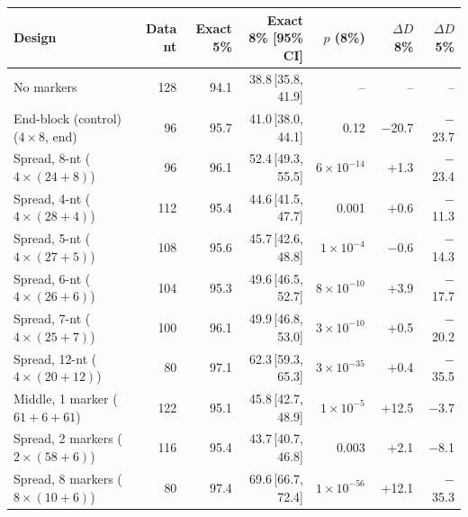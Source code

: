 \begin{tabular}{lrrrrrr}
\hline
Design & Data nt & Exact 5\% & Exact 8\% [95\% CI] & $p$ (8\%) & $\Delta D$ 8\% & $\Delta D$ 5\% \\
\hline
No markers & 128 & 94.1 & 38.8\,[35.8, 41.9] & -- & -- & -- \\
End-block (control) ($4\times8$, end) & 96 & 95.7 & 41.0\,[38.0, 44.1] & 0.12 & $-$20.7 & $-$23.7 \\
Spread, 8-nt ($4\times(24+8)$) & 96 & 96.1 & 52.4\,[49.3, 55.5] & $6\times10^{-14}$ & +1.3 & $-$23.4 \\
Spread, 4-nt ($4\times(28+4)$) & 112 & 95.4 & 44.6\,[41.5, 47.7] & 0.001 & +0.6 & $-$11.3 \\
Spread, 5-nt ($4\times(27+5)$) & 108 & 95.6 & 45.7\,[42.6, 48.8] & $1\times10^{-4}$ & $-$0.6 & $-$14.3 \\
Spread, 6-nt ($4\times(26+6)$) & 104 & 95.3 & 49.6\,[46.5, 52.7] & $8\times10^{-10}$ & +3.9 & $-$17.7 \\
Spread, 7-nt ($4\times(25+7)$) & 100 & 96.1 & 49.9\,[46.8, 53.0] & $3\times10^{-10}$ & +0.5 & $-$20.2 \\
Spread, 12-nt ($4\times(20+12)$) & 80 & 97.1 & 62.3\,[59.3, 65.3] & $3\times10^{-35}$ & +0.4 & $-$35.5 \\
Middle, 1 marker ($61+6+61$) & 122 & 95.1 & 45.8\,[42.7, 48.9] & $1\times10^{-5}$ & +12.5 & $-$3.7 \\
Spread, 2 markers ($2\times(58+6)$) & 116 & 95.4 & 43.7\,[40.7, 46.8] & 0.003 & +2.1 & $-$8.1 \\
Spread, 8 markers ($8\times(10+6)$) & 80 & 97.4 & 69.6\,[66.7, 72.4] & $1\times10^{-56}$ & +12.1 & $-$35.3 \\
\hline
\end{tabular}
